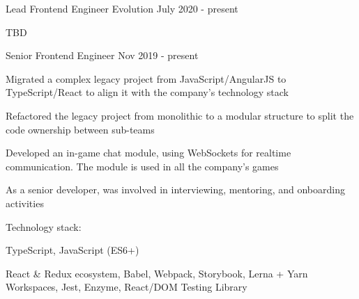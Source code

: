 

\begin{cventries}


  \cventry
    {Lead Frontend Engineer} %
    {Evolution} %
    {} %
    {July 2020 - present} %
    {
      \begin{cvitems}
        \item TBD
      \end{cvitems}
    }

  \cventry
    {Senior Frontend Engineer} %
    {} %
    {} %
    {Nov 2019 - present} %
    {
      \begin{cvitems}
        \item Migrated a complex legacy project from JavaScript/AngularJS to TypeScript/React to align it with the company's technology stack
        \item Refactored the legacy project from monolithic to a modular structure to split the code ownership between sub-teams
        \item Developed an in-game chat module, using WebSockets for realtime communication. The module is used in all the company's games
        \item As a senior developer, was involved in interviewing, mentoring, and onboarding activities
      \end{cvitems}
      \vspace{5mm}
      Technology stack:
      \begin{cvstackitems}
        \item TypeScript, JavaScript (ES6+)
        \item React \& Redux ecosystem, Babel, Webpack, Storybook, Lerna + Yarn Workspaces, Jest, Enzyme, React/DOM Testing Library
      \end{cvstackitems}
      \vspace{-2.0mm}
    }


\end{cventries}
